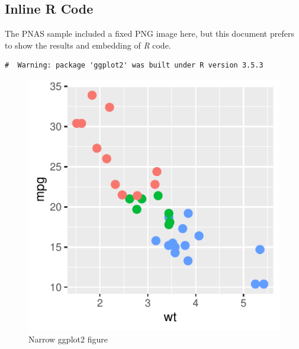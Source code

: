 \documentclass[letterpaper,9pt,twocolumn,twoside,]{pinp}
\begin{document}
\hypertarget{inline-r-code}{%
\subsection{Inline R Code}\label{inline-r-code}}

The PNAS sample included a fixed PNG image here, but this document
prefers to show the results and embedding of \emph{R} code.

\begin{Shaded}
\begin{Highlighting}[]
\end{Highlighting}
\end{Shaded}

\begin{ShadedResult}
\begin{verbatim}
#  Warning: package 'ggplot2' was built under R version 3.5.3
\end{verbatim}
\end{ShadedResult}

\begin{Shaded}
\begin{Highlighting}[]
\OperatorTok{+}
\StringTok{    }\NormalTok{(}\NormalTok{, }\NormalTok{(}\OperatorTok{+}
\StringTok{    }\NormalTok{(}\NormalTok{)}
\end{Highlighting}
\end{Shaded}

\begin{figure}

{\centering \includegraphics{Untitled3_files/figure-latex/figex-1} 

}

\caption{Narrow ggplot2 figure}\label{fig:figex}
\end{figure}
\end{document}
